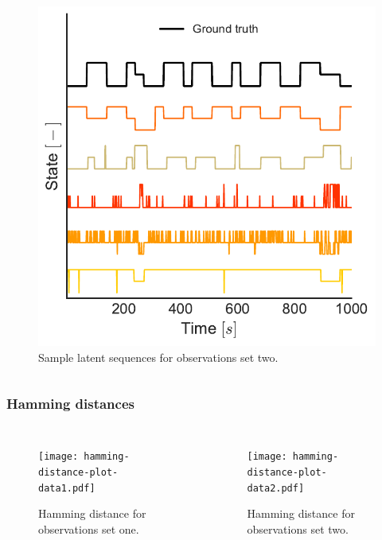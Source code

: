 \documentclass[aspectratio=169]{beamer}
\begin{document}
\begin{frame}
\begin{columns}[c]
            \begin{figure}
                \includegraphics[width=1.0\linewidth]{state-seq-data2.pdf}
                \caption{Sample latent sequences for observations set two.}
            \end{figure}

        \end{columns}

    \end{frame}


    \begin{frame}
        \frametitle{Hamming distances}

        \begin{columns}[c] 


            \begin{figure}
                \texttt{[image: hamming-distance-plot-data1.pdf]}
                \caption{Hamming distance for observations set one.}
            \end{figure}


            \begin{figure}
                \texttt{[image: hamming-distance-plot-data2.pdf]}
                \caption{Hamming distance for observations set two.}
            \end{figure}

        \end{columns}

    \end{frame}
\end{document}
